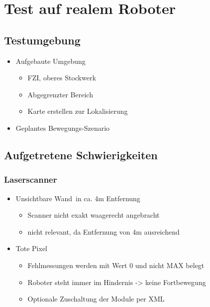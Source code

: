 
\chapter{Test auf realem Roboter}


\section{Testumgebung}

\begin{itemize}
	\item Aufgebaute Umgebung
	\begin{itemize}
		\item FZI, oberes Stockwerk
		\item Abgegrenzter Bereich
		\item Karte erstellen zur Lokalisierung
	\end{itemize}
	\item Geplantes Bewegungs-Szenario
\end{itemize}


\section{Aufgetretene Schwierigkeiten}

\subsection{Laserscanner}

\begin{itemize}
	\item \glqq Unsichtbare Wand\grqq\ in ca. 4m Entfernung
	\begin{itemize}
		\item Scanner nicht exakt waagerecht angebracht
		\item nicht relevant, da Entfernung von 4m ausreichend
	\end{itemize}
	\item \glqq Tote Pixel\grqq
	\begin{itemize}
		\item Fehlmessungen werden mit Wert 0 und nicht MAX belegt
		\item Roboter steht immer im Hindernis -> keine Fortbewegung
		\item Optionale Zuschaltung der Module per XML
	\end{itemize}
\end{itemize}


